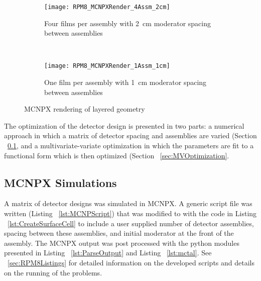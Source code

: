 \begin{figure}
    \centering
    \begin{subfigure}[b]{0.45\textwidth}
        \texttt{[image: RPM8\_MCNPXRender\_4Assm\_2cm]}
        \caption{Four films per assembly with \SI{2}{\centi\meter} moderator spacing between assemblies}
    \end{subfigure}%
    ~
    \begin{subfigure}[b]{0.45\textwidth}
        \texttt{[image: RPM8\_MCNPXRender\_1Assm\_1cm]}
        \caption{One film per assembly with \SI{1}{\centi\meter} moderator spacing between assemblies}
    \end{subfigure}
    \caption{MCNPX rendering of layered geometry}
    \label{fig:MCNPXRendering}
\end{figure}
The optimization of the detector design is presented in two parts: a numerical approach in which a matrix of detector spacing and assemblies are varied (Section ~\ref{sec:MCNPXMethods}, and a multivariate-variate optimization in which the parameters are fit to a functional form which is then optimized (Section ~\ref{sec:MVOptimization}.
\subsection{MCNPX Simulations}
\label{sec:MCNPXMethods}
A matrix of detector designs was simulated in MCNPX.
A generic script file was written (Listing ~\ref{lst:MCNPScript}) that was modified to with the code in Listing ~\ref{lst:CreateSurfaceCell} to include a user supplied number of detector assemblies, spacing between these assemblies, and initial moderator at the front of the assembly.
The MCNPX output was post processed with the python modules presented in Listing ~\ref{lst:ParseOutput} and Listing ~\ref{lst:mctal}.
See ~\ref{sec:RPM8Listings} for detailed information on the developed scripts and details on the running of the problems.

